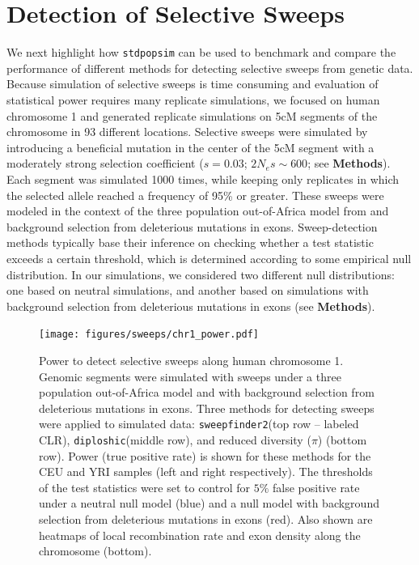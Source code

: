 \documentclass[hidelinks]{article}
\newcommand{\stdpopsim}{\texttt{stdpopsim}\xspace}
\newcommand{\sweepfinder}{\texttt{sweepfinder2}\xspace}
\newcommand{\diploshic}{\texttt{diploshic}\xspace}
\begin{document}
\section*{Detection of Selective Sweeps}
    \label{sweeps}
    We next highlight how \stdpopsim can be used to benchmark and compare
    the performance of different methods for detecting selective sweeps from genetic data.
    Because simulation of selective sweeps is time consuming and evaluation of statistical power requires
    many replicate simulations, we focused on human chromosome 1 and generated replicate simulations on 5cM segments
    of the chromosome in 93 different locations. %
    Selective sweeps were simulated by introducing a beneficial mutation in the center of the 5cM segment
    with a moderately strong selection coefficient ($s = 0.03$; $2N_es \sim 600$; see \textbf{Methods}).
    Each segment was simulated 1000 times, while keeping only replicates in which the selected allele reached a frequency of 95\% or greater.
    These sweeps were modeled in the context of the three population out-of-Africa model from \citet{gutenkunst2009inferring}
    and background selection from deleterious mutations in exons.
    Sweep-detection methods typically base their inference on checking whether a test statistic
    exceeds a certain threshold, which is determined according to some empirical null distribution.
    In our simulations, we considered two different null distributions:
    one based on neutral simulations, and another based on simulations with background selection
    from deleterious mutations in exons (see \textbf{Methods}).

    \begin{figure}[b!]
        \centering
        \texttt{[image: figures/sweeps/chr1\_power.pdf]}
        \caption{
        Power to detect selective sweeps along human
        chromosome 1. Genomic segments were simulated with sweeps under a three population out-of-Africa model
        and with background selection from deleterious mutations in exons.
        Three methods for detecting sweeps were applied to simulated data:
        \sweepfinder (top row -- labeled CLR),
        \diploshic (middle row),
        and reduced diversity ($\pi$) (bottom row).
        Power (true positive rate) is shown for these methods for the CEU and YRI
        samples (left and right respectively).
        The thresholds of the test statistics were set to control for
        $5\%$ false positive rate under a neutral null model (blue)
        and a null model with background selection from deleterious mutations in exons (red).
        Also shown are heatmaps of local recombination rate and exon density along the
        chromosome (bottom).
        }
        \label{fig:chr1_power}
    \end{figure}
\end{document}
